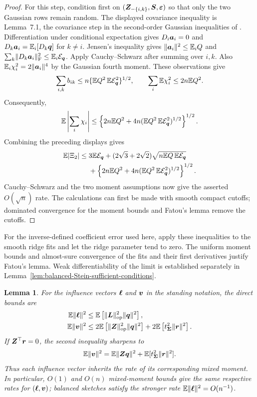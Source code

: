 \documentclass{article}
\theoremstyle{plain} %
\newtheorem{lemma}[theorem]{Lemma}
\theoremstyle{definition} %
\theoremstyle{definition} %
\begin{document}
\begin{proof}
For this step, condition first on
$(\boldsymbol{Z}_{-\{i,k\}},\boldsymbol{S},{\boldsymbol{\varepsilon} })$ so that only the two Gaussian rows remain
random. The displayed covariance inequality is Lemma~7.1, the covariance step in the second-order Gaussian
inequalities of \citet{bellec2023out}.  Differentiation under conditional
expectation gives
$D_i\boldsymbol{a}_i=0$ and $D_k\boldsymbol{a}_i={\mathbb{E}}_i[D_k\boldsymbol{q}]$ for $k\ne i$.  Jensen's inequality
gives $\lVert\boldsymbol{a}_i\rVert^2\leq{\mathbb{E}}_i Q$ and
$\sum_k\lVert D_k\boldsymbol{a}_i\rVert_{\rm F}^2\leq{\mathbb{E}}_i{\mathcal E}_{\boldsymbol{q}}$.
Apply Cauchy--Schwarz after summing over $i,k$.
Also ${\mathbb{E}}_i\chi_i^2=2\lVert\boldsymbol{a}_i\rVert^4$ by the Gaussian fourth moment.
These observations give
\begin{align*}
    \sum_{i,k}b_{ik}
       \leq n\{{\mathbb{E}} Q^2\,{\mathbb{E}}{\mathcal E}_{\boldsymbol{q}}^2\}^{1/2},
    \qquad
    \sum_i{\mathbb{E}}\chi_i^2\leq2n{\mathbb{E}} Q^2.
\end{align*}
Consequently,
\begin{align*}
    {\mathbb{E}}\left|\sum_i\chi_i\right|
    \leq
    \left\{2n{\mathbb{E}} Q^2
       +4n({\mathbb{E}} Q^2\,{\mathbb{E}}{\mathcal E}_{\boldsymbol{q}}^2)^{1/2}\right\}^{1/2}.
\end{align*}
Combining the preceding displays gives
\begin{align*}
    {\mathbb{E}}|\Xi_2|
    \leq{}&3{\mathbb{E}}{\mathcal E}_{\boldsymbol{q}}
       +(2\sqrt3+2\sqrt2)\sqrt{n{\mathbb{E}} Q\,{\mathbb{E}}{\mathcal E}_{\boldsymbol{q}}}\\
       &+\left\{2n{\mathbb{E}} Q^2
       +4n({\mathbb{E}} Q^2\,{\mathbb{E}}{\mathcal E}_{\boldsymbol{q}}^2)^{1/2}\right\}^{1/2}.
\end{align*}
Cauchy--Schwarz and the two moment assumptions now give the asserted
$O(\sqrt n)$ rate. The calculations can first be made with smooth compact
cutoffs; dominated convergence for the moment bounds and Fatou's lemma
remove the cutoffs.
\end{proof}

For the inverse-defined coefficient error used here, apply these inequalities
to the smooth ridge fits and let the ridge parameter tend to zero. The
uniform moment bounds and almost-sure convergence of the fits and their
first derivatives justify Fatou's lemma. Weak differentiability of the limit
is established separately in
Lemma~\ref{lem:balanced-Stein-sufficient-conditions}.

\begin{lemma}
\label{lem:influence-from-moments}
For the influence vectors $\boldsymbol{\ell}$ and $\boldsymbol{v}$ in the standing notation, the
direct bounds are
\begin{align*}
    {\mathbb{E}}\lVert\boldsymbol{\ell}\rVert^2
    &\leq{\mathbb{E}}\left[\lVert\boldsymbol{L}\rVert_{\rm op}^2\lVert\boldsymbol{q}\rVert^2\right],\\
    {\mathbb{E}}\lVert\boldsymbol{v}\rVert^2
    &\leq2{\mathbb{E}}\left[\lVert\boldsymbol{Z}\rVert_{\rm op}^2\lVert\boldsymbol{q}\rVert^2\right]
       +2{\mathbb{E}}\left[t_{\boldsymbol{\Sigma}}^2\lVert\boldsymbol{r}\rVert^2\right].
\end{align*}
If $\boldsymbol{Z}^\top\boldsymbol{r}=0$, the second inequality sharpens to
\begin{align*}
    {\mathbb{E}}\lVert\boldsymbol{v}\rVert^2
    ={\mathbb{E}}\lVert\boldsymbol{Z}\boldsymbol{q}\rVert^2+{\mathbb{E}}[t_{\boldsymbol{\Sigma}}^2\lVert\boldsymbol{r}\rVert^2].
\end{align*}
Thus each influence vector inherits the rate of its corresponding mixed
moment.  In particular, $O(1)$ and $O(n)$ mixed-moment bounds give the same
respective rates for $(\boldsymbol{\ell},\boldsymbol{v})$; balanced sketches satisfy the stronger
rate ${\mathbb{E}}\lVert\boldsymbol{\ell}\rVert^2=O(n^{-1})$.
\end{lemma}
\end{document}
